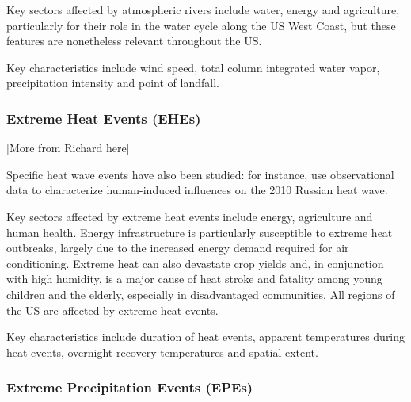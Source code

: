 \documentclass[11pt]{article}
\begin{document}





Key sectors affected by atmospheric rivers include water, energy and agriculture, particularly for their role in the water cycle along the US West Coast, but these features are nonetheless relevant throughout the US.

Key characteristics include wind speed, total column integrated water vapor, precipitation intensity and point of landfall.

\subsubsection*{Extreme Heat Events (EHEs)}

{\color{red}[More from Richard here]}

Specific heat wave events have also been studied:  for instance, \cite{dole2011grl} use observational data to characterize human-induced influences on the 2010 Russian heat wave.  

Key sectors affected by extreme heat events include energy, agriculture and human health.  Energy infrastructure is particularly susceptible to extreme heat outbreaks, largely due to the increased energy demand required for air conditioning.  Extreme heat can also devastate crop yields and, in conjunction with high humidity, is a major cause of heat stroke and fatality among young children and the elderly, especially in disadvantaged communities.  All regions of the US are affected by extreme heat events.

Key characteristics include duration of heat events, apparent temperatures during heat events, overnight recovery temperatures and spatial extent.

\subsubsection*{Extreme Precipitation Events (EPEs)}
\end{document}
